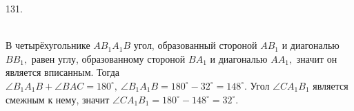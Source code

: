 131. \begin{figure}[ht!]
\end{figure}\\
В четырёхугольнике $AB_1A_1B$ угол, образованный стороной $AB_1$ и диагональю $BB_1,$ равен углу, образованному стороной $BA_1$ и диагональю $AA_1,$ значит он является вписанным. Тогда $\angle B_1A_1B+\angle BAC=180^\circ,\ \angle B_1A_1B=180^\circ-32^\circ=148^\circ.$ Угол $\angle CA_1B_1$ является смежным к нему, значит $\angle CA_1B_1=180^\circ-148^\circ=32^\circ.$\\
